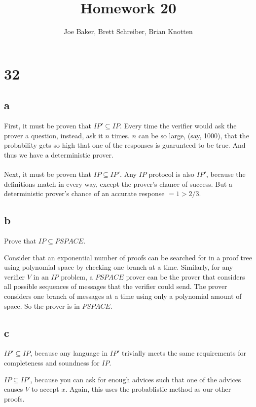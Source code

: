 \documentclass[letterpaper,notitlepage,twoside]{article}
\begin{document}
\title{Homework 20}
\author{Joe Baker, Brett Schreiber, Brian Knotten}
\maketitle

\section*{32}
\subsection*{a}
First, it must be proven that $IP' \subseteq IP$.
Every time the verifier would ask the prover a question, instead, ask it $n$ times. $n$ can be so large, (say, 1000), that the
probability gets so high that one of the responses is guarunteed to be true. And thus we have a deterministic prover. \\\\

Next, it must be proven that $IP \subseteq IP'$.
Any $IP$ protocol is also $IP'$, because the definitions match in every way, except the prover's chance of success.
But a deterministic prover's chance of an accurate response $= 1 > 2/3$.

\subsection*{b}
Prove that $IP \subseteq PSPACE$.

Consider that an exponential number of proofs can be searched for in a proof tree using polynomial space by checking one branch at a time. Similarly, for any verifier $V$ in an $IP$ problem, a $PSPACE$ prover can be the prover that considers all possible sequences of messages that the verifier could send. The prover considers one branch of messages at a time using only a polynomial amount of space. So the prover is in $PSPACE$.

\subsection{c}
$IP' \subseteq IP$, because any language in $IP'$ trivially meets the same requirements for completeness and soundness for $IP$.

$IP \subseteq IP'$, because you can ask for enough advices such that one of the advices causes $V$ to accept $x$. Again, this uses the probablistic method as our other proofs.
\end{document}
